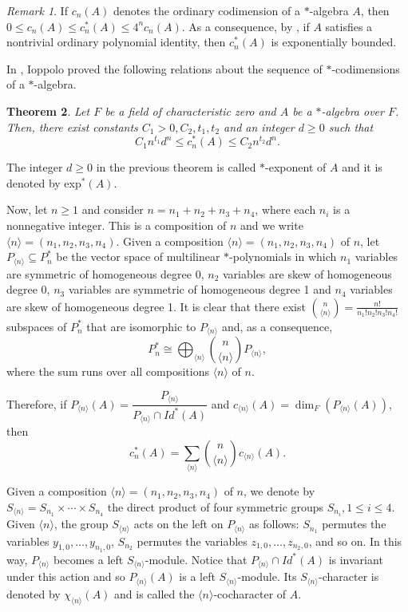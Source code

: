 \documentclass[11pt]{amsart}
\newtheorem{theorem}{Theorem}[section]
\theoremstyle{definition}
\theoremstyle{remark}
\newtheorem{remark}[theorem]{Remark}
\begin{document}
	\begin{remark}
		If $c_n(A)$ denotes the ordinary codimension of a $*$-algebra $A$, then $0\leq c_n(A)\leq c_n^*(A) \leq 4^nc_n(A)$. As a consequence, by \cite{Regev}, if $A$ satisfies a nontrivial ordinary polynomial identity, then $c_n^*(A)$ is exponentially bounded.
	\end{remark}
	
	In \cite{Ninni}, Ioppolo proved the following relations about the sequence of $*$-codimensions of a $*$-algebra. 
	
	\begin{theorem}
		Let $F$ be a field of characteristic zero and $A$ be a $*$-algebra over $F$. Then, there exist constants $C_1>0, C_2, t_1, t_2$ and an integer $d\geq 0$ such that $$C_1n^{t_1}d^n\leq c_n^*(A)\leq C_2n^{t_2}d^n.$$
	\end{theorem}
	
	The integer $d\geq 0$ in the previous theorem is called $*$-exponent of $A$ and it is denoted by exp$^*(A)$.
	
	Now, let $n\geq 1$ and consider $n=n_1+n_2+n_3+n_4$, where each $n_i$ is a nonnegative integer. This is a composition of $n$ and we write $\langle n\rangle=(n_1,n_2,n_3,n_4)$. Given a composition $\langle n\rangle=(n_1,n_2,n_3,n_4)$ of $n$, let $P_{\langle n\rangle}\subseteq P_n^*$ be the vector space of multilinear $*$-po\-ly\-no\-mi\-als in which $n_1$ variables are symmetric of homogeneous degree 0, $n_2$ variables are skew of homogeneous degree 0, $n_3$ variables are symmetric of homogeneous degree 1 and $n_4$ variables are skew of homogeneous degree 1. It is clear that there exist $\binom{n}{{\langle n\rangle}}=\frac{n!}{n_1!n_2!n_3!n_4!}$ subspaces of $P_n^*$ that are isomorphic to $P_{\langle n\rangle}$ and, as a consequence, $$ P_n^*\cong \bigoplus_{{\langle n\rangle}}\binom{n}{{\langle n\rangle}}P_{{\langle n\rangle}},$$  where the sum runs over all compositions $\langle n\rangle$ of $n$. 
	
	Therefore, if $P_{\langle n\rangle}(A)=\dfrac{P_{\langle n\rangle}}{P_{\langle n\rangle}\cap Id^*(A)}$ and $c_{\langle n\rangle}(A)=\dim_F(P_{\langle n\rangle}(A))$, then \begin{equation}\label{codim}
		c_n^*(A)=\displaystyle \sum_{\langle n\rangle}\binom{n}{{\langle n\rangle}}c_{\langle n\rangle}(A).
	\end{equation}
	
	Given a composition $\langle n\rangle=(n_1,n_2,n_3,n_4)$ of $n$, we denote by $S_{\langle n \rangle}=S_{n_1}\times \cdots \times S_{n_4}$ the direct product of four symmetric groups $S_{n_i},1\leq i\leq 4$. Given $\langle n \rangle$, the group $S_{\langle n \rangle}$ acts on the left on $P_{\langle n \rangle}$ as follows: $S_{n_1}$ permutes the variables $y_{1,0}, \ldots, y_{n_1,0}$, $S_{n_2}$ permutes the variables $z_{1,0},\ldots, z_{n_2,0}$, and so on. In this way, $P_{\langle n \rangle}$ becomes a left $S_{\langle n \rangle}$-module. Notice that $P_{\langle n\rangle}\cap Id^*(A)$ is invariant under this action and so $P_{\langle n\rangle}(A)$ is a left $S_{\langle n\rangle}$-module. Its $S_{\langle n\rangle}$-character is denoted by $\chi_{\langle n\rangle}(A)$ and is called the $\langle n\rangle$-cocharacter of $A$.
\end{document}
